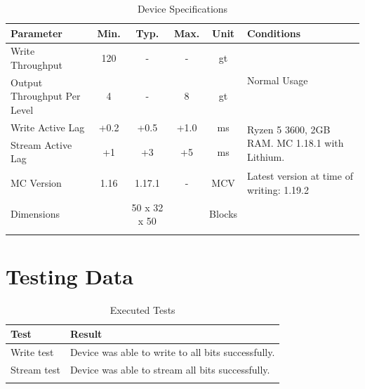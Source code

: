 \documentclass[10pt]{datasheet}
\begin{document}
\begin{table}[h]
    \caption{Device Specifications}
    \begin{tabularx}{\textwidth}{l | c c c | c | X}
        \thickhline
        \textbf{Parameter} & \textbf{Min.} & \textbf{Typ.} & \textbf{Max.} &
        \textbf{Unit} & \textbf{Conditions} \\
        \hline
        Write Throughput  & 120 & - & - & gt & \multirow{2}{*}{Normal Usage} \\
        Output Throughput Per Level & 4 & - & 8 & gt & \\
        \hline
        Write Active Lag & +0.2 & +0.5 & +1.0 & ms & \multirow{2}{5cm}{Ryzen 5 3600, 2GB RAM. MC 1.18.1 with Lithium.} \\
        Stream Active Lag & +1 & +3 & +5 & ms & \\
        \hline
        MC Version & 1.16 & 1.17.1 & - & MCV & Latest version at time of writing: 1.19.2\\
        \hline
        Dimensions & & 50 x 32 x 50 & & Blocks & \\
        \thickhline
\end{tabularx}
\end{table}
\newpage
\section{Testing Data}
\begin{table}[h]
\caption{Executed Tests}
\begin{tabularx}{\textwidth}{l | X}
    \thickhline
    \textbf{Test} & \textbf{Result} \\
    \hline
    Write test & Device was able to write to all bits successfully.\\
    \hline
    Stream test & Device was able to stream all bits successfully.\\
    \thickhline
\end{tabularx}
\end{table}
\end{document}
